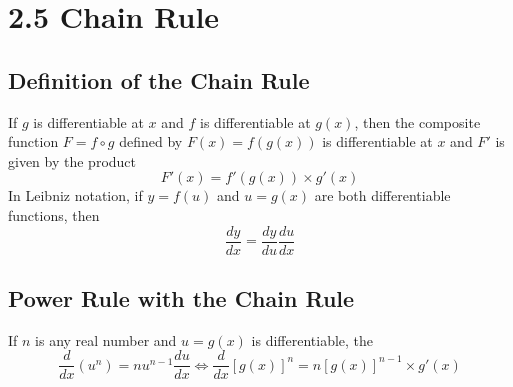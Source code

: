 %
%

\section*{2.5 Chain Rule}

\subsection*{Definition of the Chain Rule}

If \(g\) is differentiable at \(x\) and \(f\) is differentiable at \(g(x)\), then the composite function \(F=f \circ g\) defined by \(F(x)=f(g(x))\) is differentiable at \(x\) and \(F'\) is given by the product 
$$F'(x)=f'(g(x)) \times g'(x)$$
In Leibniz notation, if \(y=f(u)\) and \(u=g(x)\) are both differentiable functions, then
$$ \frac{dy}{dx}=\frac{dy}{du}\frac{du}{dx} $$

\subsection*{Power Rule with the Chain Rule}

If \(n\) is any real number and \(u=g(x)\) is differentiable, the 
$$\frac{d}{dx}(u^n)=nu^{n-1}\frac{du}{dx} \Leftrightarrow \frac{d}{dx}[g(x)]^n=n[g(x)]^{n-1} \times g'(x)$$
